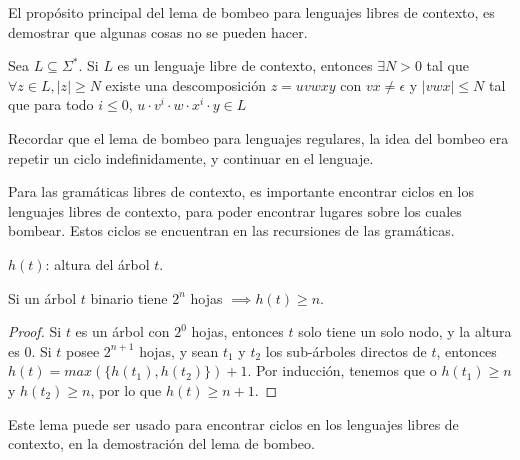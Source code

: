 \documentclass[a4paper,twoside,master.tex]{article}
\begin{document}

El propósito principal del lema de bombeo para lenguajes libres de contexto, es demostrar que algunas cosas no se pueden hacer.

\begin{lema}
    Sea $L \subseteq \Sigma^{*}$. Si $L$ es un lenguaje libre de contexto, entonces $\exists N > 0$ tal que $\forall z \in L, |z| \ge N$ existe una descomposición $z = u v w x y$ con $vx \neq \epsilon$ y $|vwx| \le N$ tal que para todo $i \le 0$, $u \cdot v^i \cdot w \cdot x^i \cdot y \in L$
\end{lema}

Recordar que el lema de bombeo para lenguajes regulares, la idea del bombeo era repetir un ciclo indefinidamente, y continuar en el lenguaje.

Para las gramáticas libres de contexto, es importante encontrar ciclos en los lenguajes libres de contexto, para poder encontrar lugares sobre los cuales bombear. Estos ciclos se encuentran en las recursiones de las gramáticas.

\begin{notacion}
    $h(t)$: altura del árbol $t$.
\end{notacion}
\begin{lema}
    Si un árbol $t$ binario tiene $2^n$ hojas $\implies h(t) \ge n$.
\end{lema}
\begin{proof}
    Si $t$ es un árbol con $2^0$ hojas, entonces $t$ solo tiene un solo nodo, y la altura es $0$. Si $t$ posee $2^{n + 1}$ hojas, y sean $t_1$ y $t_2$ los sub-árboles directos de $t$, entonces $h(t) = max(\{h(t_1), h(t_2)\}) + 1$. Por inducción, tenemos que o $h(t_1) \ge n$ y $h(t_2) \ge n$, por lo que $h(t) \ge n + 1$.
\end{proof}

Este lema puede ser usado para encontrar ciclos en los lenguajes libres de contexto, en la demostración del lema de bombeo.
\end{document}
